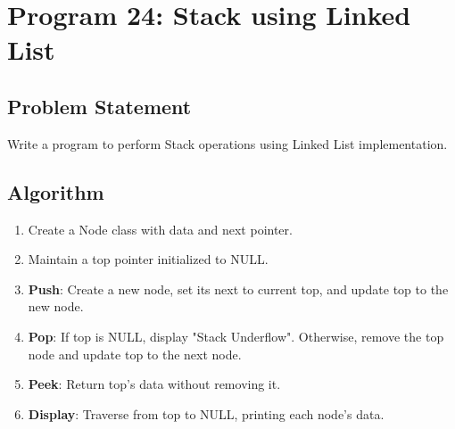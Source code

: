 \documentclass[a4paper,12pt]{article}
\begin{document}
\section*{Program 24: Stack using Linked List}

\subsection*{Problem Statement}
Write a program to perform Stack operations using Linked List implementation.

\subsection*{Algorithm}
\begin{enumerate}
    \item Create a Node class with data and next pointer.
    \item Maintain a top pointer initialized to NULL.
    \item \textbf{Push}: Create a new node, set its next to current top, and update top to the new node.
    \item \textbf{Pop}: If top is NULL, display "Stack Underflow". Otherwise, remove the top node and update top to the next node.
    \item \textbf{Peek}: Return top's data without removing it.
    \item \textbf{Display}: Traverse from top to NULL, printing each node's data.
\end{enumerate}
\end{document}
